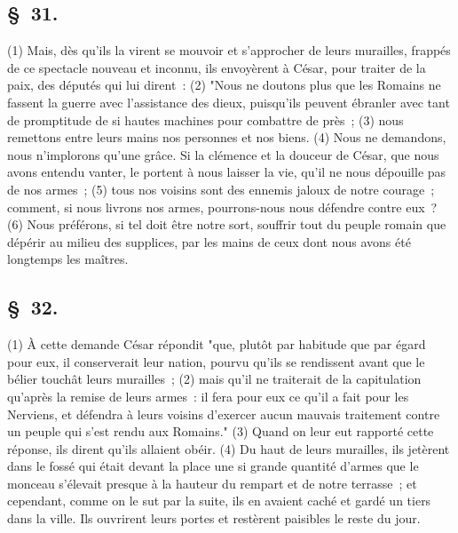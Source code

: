\documentclass[french,twoside]{book} %
\begin{document}
\subsection[{§ 31.}]{ \textsc{§ 31.} }
\noindent (1) Mais, dès qu’ils la virent se mouvoir et s’approcher de leurs murailles, frappés de ce spectacle nouveau et inconnu, ils envoyèrent à César, pour traiter de la paix, des députés qui lui dirent : (2) "Nous ne doutons plus que les Romains ne fassent la guerre avec l’assistance des dieux, puisqu’ils peuvent ébranler avec tant de promptitude de si hautes machines pour combattre de près ; (3) nous remettons entre leurs mains nos personnes et nos biens. (4) Nous ne demandons, nous n’implorons qu’une grâce. Si la clémence et la douceur de César, que nous avons entendu vanter, le portent à nous laisser la vie, qu’il ne nous dépouille pas de nos armes ; (5) tous nos voisins sont des ennemis jaloux de notre courage ; comment, si nous livrons nos armes, pourrons-nous nous défendre contre eux ? (6) Nous préférons, si tel doit être notre sort, souffrir tout du peuple romain que dépérir au milieu des supplices, par les mains de ceux dont nous avons été longtemps les maîtres.
\subsection[{§ 32.}]{ \textsc{§ 32.} }
\noindent (1) À cette demande César répondit "que, plutôt par habitude que par égard pour eux, il conserverait leur nation, pourvu qu’ils se rendissent avant que le bélier touchât leurs murailles ; (2) mais qu’il ne traiterait de la capitulation qu’après la remise de leurs armes : il fera pour eux ce qu’il a fait pour les Nerviens, et défendra à leurs voisins d’exercer aucun mauvais traitement contre un peuple qui s’est rendu aux Romains." (3) Quand on leur eut rapporté cette réponse, ils dirent qu’ils allaient obéir. (4) Du haut de leurs murailles, ils jetèrent dans le fossé qui était devant la place une si grande quantité d’armes que le monceau s’élevait presque à la hauteur du rempart et de notre terrasse ; et cependant, comme on le sut par la suite, ils en avaient caché et gardé un tiers dans la ville. Ils ouvrirent leurs portes et restèrent paisibles le reste du jour.
\end{document}
